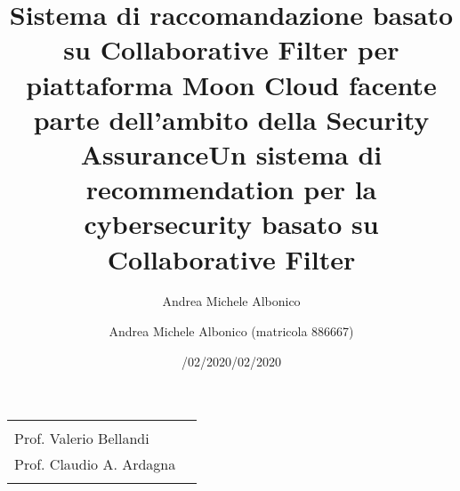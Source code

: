 \documentclass[10pt,a4paper]{article}
\title{Sistema di raccomandazione basato su Collaborative Filter per piattaforma Moon Cloud 
facente parte dell'ambito della Security Assurance}
\author{Andrea Michele Albonico}
\date{/02/2020}
\begin{document}
\title{\textbf{Un sistema di recommendation per la cybersecurity basato su Collaborative Filter}}
\author{Andrea Michele Albonico (matricola 886667)}
\date{/02/2020}

\maketitle

\vspace{0.5 cm}

\begin{minipage}{\linewidth}
    \begin{tabular}{l r}
        \begin{minipage}[t]{.4\linewidth}
            \begin{flushleft}
                {
                    RELATORE\\[.15cm]
                    Prof. Valerio Bellandi
                }
            \end{flushleft}
        \end{minipage}
        &
        \begin{minipage}[t]{.53\linewidth}
            \begin{flushright}
                {
                    CORRELATORE\\[.15cm]
                    Prof. Claudio A. Ardagna\\[.1cm]
                }
            \end{flushright}
        \end{minipage}
    \end{tabular}
\end{minipage}

\vspace{2 cm}
\end{document}
